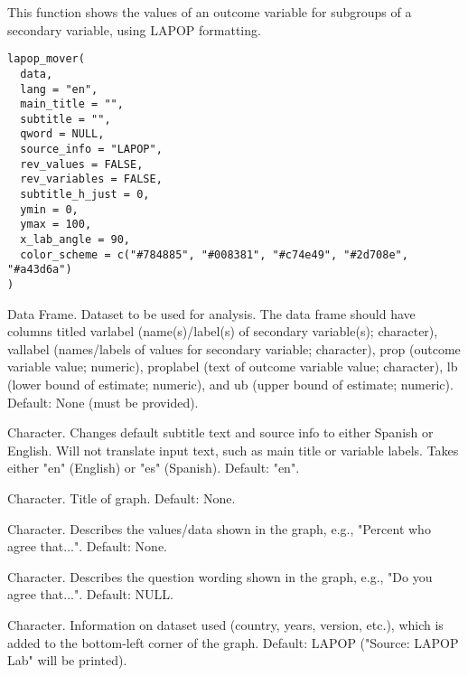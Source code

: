 \documentclass[a4paper]{book}
\begin{document}
%
\begin{Description}
This function shows the values of an outcome variable for subgroups of a secondary variable, using LAPOP formatting.
\end{Description}
%
\begin{Usage}
\begin{verbatim}
lapop_mover(
  data,
  lang = "en",
  main_title = "",
  subtitle = "",
  qword = NULL,
  source_info = "LAPOP",
  rev_values = FALSE,
  rev_variables = FALSE,
  subtitle_h_just = 0,
  ymin = 0,
  ymax = 100,
  x_lab_angle = 90,
  color_scheme = c("#784885", "#008381", "#c74e49", "#2d708e", "#a43d6a")
)
\end{verbatim}
\end{Usage}
%
\begin{Arguments}
\begin{ldescription}
\item[\code{data}] Data Frame. Dataset to be used for analysis.  The data frame should have columns
titled varlabel (name(s)/label(s) of secondary variable(s); character), vallabel (names/labels of values for secondary variable; character),
prop (outcome variable value; numeric), proplabel (text of outcome variable value; character),
lb (lower bound of estimate; numeric), and ub (upper bound of estimate; numeric).
Default: None (must be provided).

\item[\code{lang}] Character.  Changes default subtitle text and source info to either Spanish or English.
Will not translate input text, such as main title or variable labels.  Takes either "en" (English)
or "es" (Spanish).  Default: "en".

\item[\code{main\_title}] Character.  Title of graph.  Default: None.

\item[\code{subtitle}] Character.  Describes the values/data shown in the graph, e.g., "Percent who agree that...".
Default: None.

\item[\code{qword}] Character.  Describes the question wording shown in the graph, e.g., "Do you agree that...".
Default: NULL.

\item[\code{source\_info}] Character.  Information on dataset used (country, years, version, etc.),
which is added to the bottom-left corner of the graph. Default: LAPOP ("Source: LAPOP Lab" will be printed).


\end{ldescription}
\end{Arguments}
\end{document}
